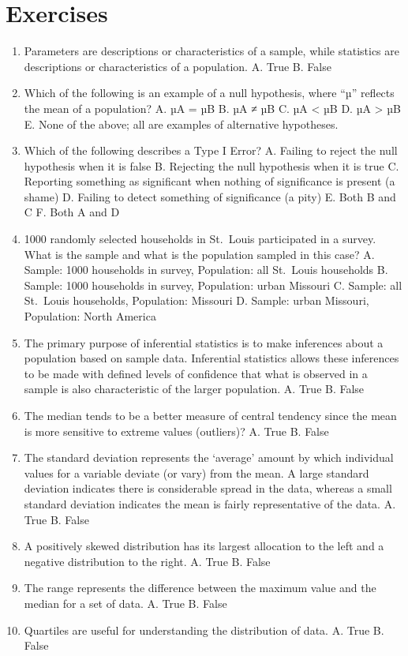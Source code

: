 \documentclass[]{book}
\begin{document}
\hypertarget{exercises}{%
\section{Exercises}\label{exercises}}

\begin{enumerate}
\def\labelenumi{\arabic{enumi}.}
\item
  Parameters are descriptions or characteristics of a sample, while statistics are descriptions or characteristics of a population.
  A. True
  B. False
\item
  Which of the following is an example of a null hypothesis, where ``µ'' reflects the mean of a population?
  A. µA = µB
  B. µA ≠ µB
  C. µA \textless{} µB
  D. µA \textgreater{} µB
  E. None of the above; all are examples of alternative hypotheses.
\item
  Which of the following describes a Type I Error?
  A. Failing to reject the null hypothesis when it is false
  B. Rejecting the null hypothesis when it is true
  C. Reporting something as significant when nothing of significance is present (a shame)
  D. Failing to detect something of significance (a pity)
  E. Both B and C
  F. Both A and D
\item
  1000 randomly selected households in St.~Louis participated in a survey. What is the sample and what is the population sampled in this case?
  A. Sample: 1000 households in survey, Population: all St.~Louis households
  B. Sample: 1000 households in survey, Population: urban Missouri
  C. Sample: all St.~Louis households, Population: Missouri
  D. Sample: urban Missouri, Population: North America
\item
  The primary purpose of inferential statistics is to make inferences about a population based on sample data. Inferential statistics allows these inferences to be made with defined levels of confidence that what is observed in a sample is also characteristic of the larger population.
  A. True
  B. False
\item
  The median tends to be a better measure of central tendency since the mean is more sensitive to extreme values (outliers)?
  A. True
  B. False
\item
  The standard deviation represents the `average' amount by which individual values for a variable deviate (or vary) from the mean. A large standard deviation indicates there is considerable spread in the data, whereas a small standard deviation indicates the mean is fairly representative of the data.
  A. True
  B. False
\item
  A positively skewed distribution has its largest allocation to the left and a negative distribution to the right.
  A. True
  B. False
\item
  The range represents the difference between the maximum value and the median for a set of data.
  A. True
  B. False
\item
  Quartiles are useful for understanding the distribution of data.
  A. True
  B. False
\end{enumerate}
\end{document}
